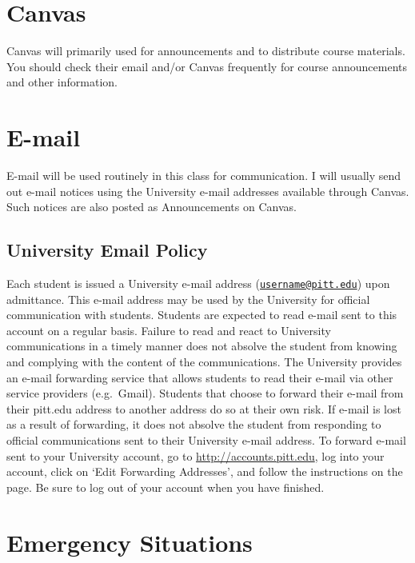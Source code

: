 \documentclass[
]{book}
\begin{document}
\hypertarget{canvas}{%
\chapter{Canvas}\label{canvas}}

Canvas will primarily used for announcements and to distribute course materials. You should check their email and/or Canvas frequently for course announcements and other information.

\hypertarget{e-mail}{%
\chapter{E-mail}\label{e-mail}}

E-mail will be used routinely in this class for communication. I will usually send out e-mail notices using the University e-mail addresses available through Canvas. Such notices are also posted as Announcements on Canvas.

\hypertarget{university-email-policy}{%
\section{University Email Policy}\label{university-email-policy}}

Each student is issued a University e-mail address (\href{mailto:username@pitt.edu}{\nolinkurl{username@pitt.edu}}) upon admittance. This e-mail address may be used by the University for official communication with students. Students are expected to read e-mail sent to this account on a regular basis. Failure to read and react to University communications in a timely manner does not absolve the student from knowing and complying with the content of the communications. The University provides an e-mail forwarding service that allows students to read their e-mail via other service providers (e.g.~Gmail). Students that choose to forward their e-mail from their pitt.edu address to another address do so at their own risk. If e-mail is lost as a result of forwarding, it does not absolve the student from responding to official communications sent to their University e-mail address. To forward e-mail sent to your University account, go to \url{http://accounts.pitt.edu}, log into your account, click on `Edit Forwarding Addresses', and follow the instructions on the page. Be sure to log out of your account when you have finished.

\hypertarget{emergency-situations}{%
\chapter{Emergency Situations}\label{emergency-situations}}
\end{document}
